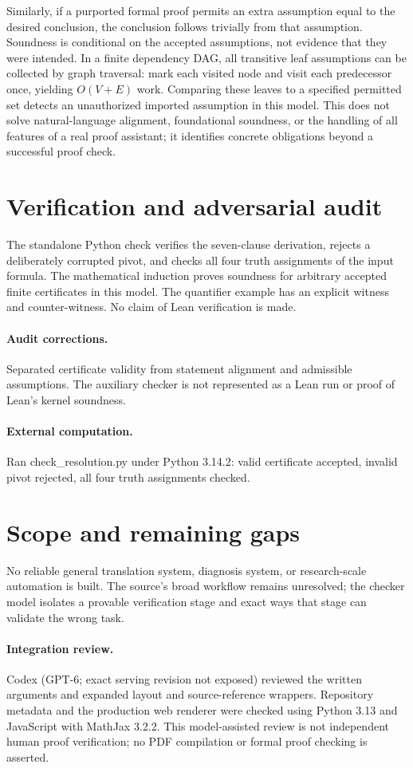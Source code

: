 \documentclass[11pt]{article}
\begin{document}
Similarly, if a purported formal proof permits an extra assumption equal to the desired conclusion, the conclusion follows trivially from that assumption. Soundness is conditional on the accepted assumptions, not evidence that they were intended. In a finite dependency DAG, all transitive leaf assumptions can be collected by graph traversal: mark each visited node and visit each predecessor once, yielding $O(V+E)$ work. Comparing these leaves to a specified permitted set detects an unauthorized imported assumption in this model. This does not solve natural-language alignment, foundational soundness, or the handling of all features of a real proof assistant; it identifies concrete obligations beyond a successful proof check.
\section{Verification and adversarial audit}
The standalone Python check verifies the seven-clause derivation, rejects a deliberately corrupted pivot, and checks all four truth assignments of the input formula. The mathematical induction proves soundness for arbitrary accepted finite certificates in this model. The quantifier example has an explicit witness and counter-witness. No claim of Lean verification is made.
\paragraph{Audit corrections.} Separated certificate validity from statement alignment and admissible assumptions. The auxiliary checker is not represented as a Lean run or proof of Lean's kernel soundness.
\paragraph{External computation.} Ran check_resolution.py under Python 3.14.2: valid certificate accepted, invalid pivot rejected, all four truth assignments checked.
\section{Scope and remaining gaps}
No reliable general translation system, diagnosis system, or research-scale automation is built. The source's broad workflow remains unresolved; the checker model isolates a provable verification stage and exact ways that stage can validate the wrong task.
\paragraph{Integration review.} Codex (GPT-6; exact serving revision not exposed) reviewed the written arguments and expanded layout and source-reference wrappers. Repository metadata and the production web renderer were checked using Python 3.13 and JavaScript with MathJax 3.2.2. This model-assisted review is not independent human proof verification; no PDF compilation or formal proof checking is asserted.
\end{document}

